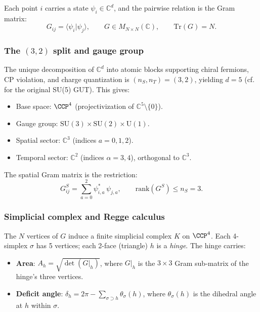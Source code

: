 \documentclass[12pt]{article}
\theoremstyle{remark}
\theoremstyle{definition}
\newcommand{\CC}{\mathbb{C}}
\begin{document}
Each point $i$ carries a state $\psi_i \in \CC^d$, and the
pairwise relation is the Gram matrix:
\begin{equation}
G_{ij} = \langle \psi_i | \psi_j \rangle, \qquad
G \in M_{N \times N}(\CC), \qquad
\mathrm{Tr}(G) = N.
\end{equation}

\subsubsection{The $(3,2)$ split and gauge group}

The unique decomposition of $\CC^d$ into atomic blocks supporting
chiral fermions, CP violation, and charge quantization is
$(n_S, n_T) = (3, 2)$, yielding $d = 5$ 
(cf.\ \cite{GeorgiGlashow} for the original SU(5) GUT). This gives:

\begin{itemize}
\item Base space: $\CCP^4$ (projectivization of
  $\CC^5 \setminus \{0\}$).
\item Gauge group: $\mathrm{SU}(3) \times \mathrm{SU}(2) \times
  \mathrm{U}(1)$.
\item Spatial sector: $\CC^3$ (indices $a = 0, 1, 2$).
\item Temporal sector: $\CC^2$ (indices $\alpha = 3, 4$),
  orthogonal to $\CC^3$.
\end{itemize}

The spatial Gram matrix is the restriction:
\begin{equation}
G^S_{ij} = \sum_{a=0}^{2} \psi^*_{i,a}\, \psi_{j,a}, \qquad
\mathrm{rank}(G^S) \leq n_S = 3.
\label{eq:GS}
\end{equation}

\subsubsection{Simplicial complex and Regge calculus}

The $N$ vertices of $G$ induce a finite simplicial complex $K$ on
$\CCP^4$. Each 4-simplex $\sigma$ has 5 vertices; each 2-face
(triangle) $h$ is a \emph{hinge}. The hinge carries:

\begin{itemize}
\item \textbf{Area}: $A_h = \sqrt{\det(G|_h)}$, where $G|_h$ is the
  $3 \times 3$ Gram sub-matrix of the hinge's three vertices.
\item \textbf{Deficit angle}: $\delta_h = 2\pi -
  \sum_{\sigma \supset h} \theta_\sigma(h)$, where $\theta_\sigma(h)$
  is the dihedral angle at $h$ within $\sigma$.
\end{itemize}
\end{document}
